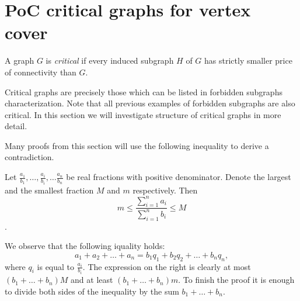 \section{PoC critical graphs for vertex cover}

\begin{defn}
A graph \(G\) is \emph{critical} if every induced subgraph \(H\) of \(G\) has strictly smaller price of connectivity than \(G\).
\end{defn}

Critical graphs are precisely those which can be listed in forbidden subgraphs characterization. Note that all previous examples of forbidden subgraphs are also critical.
In this section we will investigate structure of critical graphs in more detail.

Many proofs from this section will use the following inequality to derive a contradiction.

\begin{lemma}\label{VC:fracsum}
	Let \(\frac{a_1}{b_1}, \dots, \frac{a_i}{b_i}, \dots \frac{a_n}{b_n}\) be real fractions with positive denominator.
	Denote the largest and the smallest fraction \(M\) and \(m\) respectively.
	Then \[{m} \leq {\frac{\sum_{i=1}^{n}{a_i}}{\sum_{i=1}^{n}{b_i}}} \leq {M}\].
\end{lemma}

\begin{myproof}
	We observe that the following iquality holds:
	\[{a_1 + a_2 + \dots + a_n} = {b_1 q_1 + b_2 q_2 + \dots + b_n q_n},\] 
	where \(q_i\) is equal to \(\frac{a_i}{b_i}\).
	The expression on the right is clearly at most \((b_1 + \dots + b_n)M\) and at least \((b_1 + \dots + b_n)m\).
	To finish the proof it is enough to divide both sides of the inequality by the sum \(b_1 + \dots + b_n\).
\end{myproof}

